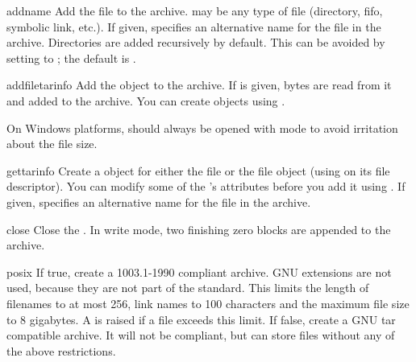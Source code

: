 \begin{methoddesc}{add}{name}
    Add the file  to the archive.  may be any type
    of file (directory, fifo, symbolic link, etc.).
    If given,  specifies an alternative name for the file in the
    archive. Directories are added recursively by default.
    This can be avoided by setting  to ;
    the default is .
\end{methoddesc}

\begin{methoddesc}{addfile}{tarinfo}
    Add the  object  to the archive.
    If  is given,  bytes are read
    from it and added to the archive.  You can create  objects
    using .
    \begin{notice}
    On Windows platforms,  should always be opened with mode
     to avoid irritation about the file size.
    \end{notice}
\end{methoddesc}

\begin{methoddesc}{gettarinfo}{}
    Create a  object for either the file  or
    the file object  (using  on its
    file descriptor).  You can modify some of the 's
    attributes before you add it using .  If given,
     specifies an alternative name for the file in the
    archive.
\end{methoddesc}

\begin{methoddesc}{close}{}
    Close the . In write mode, two finishing zero
    blocks are appended to the archive.
\end{methoddesc}

\begin{memberdesc}{posix}
    If true, create a \POSIX{} 1003.1-1990 compliant archive. GNU
    extensions are not used, because they are not part of the \POSIX{}
    standard.  This limits the length of filenames to at most 256,
    link names to 100 characters and the maximum file size to 8
    gigabytes. A  is raised if a file exceeds
    this limit.  If false, create a GNU tar compatible archive.  It
    will not be \POSIX{} compliant, but can store files without any
    of the above restrictions.
\end{memberdesc}

